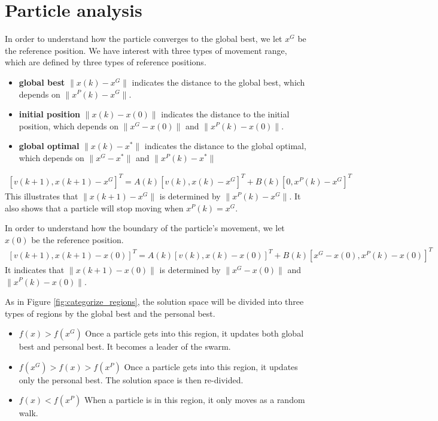 \section{Particle analysis}
\label{sec:particle}

In order to understand how the particle converges to the global best, we let $ x^{G} $ be the reference position.
We have interest with three types of movement range, which are defined by three types of reference positions.
\begin{itemize}
\item \textbf{global best} $ \lVert x(k) - x^{G} \rVert $ indicates the distance to the global best, which depends on  $ \lVert x^{P}(k) - x^{G} \rVert $.
\item \textbf{initial position} $ \lVert x(k) - x(0) \rVert $ indicates the distance to the initial position, which depends on $ \lVert x^{G} - x(0) \rVert $ and $ \lVert x^{P}(k) - x(0) \rVert $.
\item \textbf{global optimal} $ \lVert x(k) - x^{*} \rVert $ indicates the distance to the global optimal, which depends on $ \lVert x^{G} -  x^{*} \rVert $ and $ \lVert x^{P}(k) -  x^{*} \rVert $
\end{itemize}

\begin{equation}
\label{eq:rel_gb}
\begin{aligned}
[ v(k+1), x(k+1) - x^{G} ]^{T} = A(k) [ v(k), x(k) - x^{G} ]^{T} + B(k) [ 0, x^{P}(k) - x^{G} ]^{T}
\end{aligned}
\end{equation}
This illustrates that $ \lVert x(k+1) - x^{G} \rVert $ is determined by $ \lVert x^{P}(k) - x^{G} \rVert $.
It also shows that a particle will stop moving when $ x^{P}(k) = x^{G} $.

In order to understand how the boundary of the particle's movement, we let $ x(0) $ be the reference position.
\begin{equation}
\label{eq:rel_init}
\begin{aligned}
[ v(k+1), x(k+1) - x(0) ]^{T} = A(k) [ v(k), x(k) - x(0) ]^{T} + B(k) [ x^{G} - x(0), x^{P}(k) - x(0) ]^{T}
\end{aligned}
\end{equation}
It indicates that $ \lVert x(k+1) - x(0) \rVert  $ is determined by $ \lVert x^{G} - x(0) \rVert $ and $ \lVert x^{P}(k) - x(0) \rVert $.


As in Figure \ref{fig:categorize_regions}, the solution space will be divided into three types of regions by the global best and the personal best.
\begin{itemize}
\item $ f(x) > f(x^G) $
Once a particle gets into this region, it updates both global best and personal best. 
It becomes a leader of the swarm.
\item $ f(x^{G}) > f(x) > f(x^{P}) $
Once a particle gets into this region, it updates only the personal best.
The solution space is then re-divided.
\item $ f(x) < f(x^{P}) $
When a particle is in this region, it only moves as a random walk.
\end{itemize}

